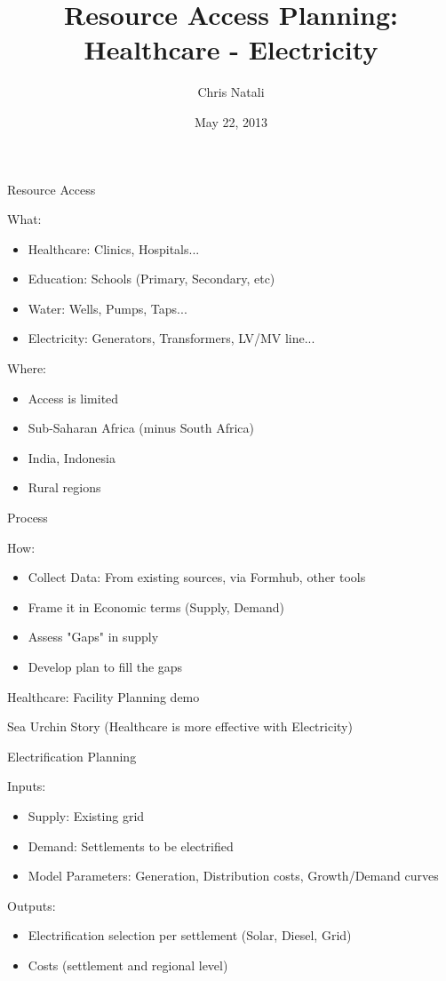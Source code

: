 \documentclass{beamer}
\title{Resource Access Planning:  Healthcare - Electricity}
\author{Chris Natali}
\institute{Modi Labs at Columbia University}
\date{May 22, 2013}
\begin{document}
\begin{frame}{Resource Access}

  What: 
  \begin{itemize}
  \item[] Healthcare:  Clinics, Hospitals...
  \item[] Education:  Schools (Primary, Secondary, etc)
  \item[] Water:  Wells, Pumps, Taps...
  \item[] Electricity:  Generators, Transformers, LV/MV line...
  \end{itemize}
 
  \bigskip 

  Where: 
  \begin{itemize}
  \item[] Access is limited
  \item[] Sub-Saharan Africa (minus South Africa)
  \item[] India, Indonesia
  \item[] Rural regions
  \end{itemize}


\end{frame}


\begin{frame}{Process}

  How: 
  \begin{itemize}
  \item[] Collect Data:  From existing sources, via Formhub, other tools
  \item[] Frame it in Economic terms (Supply, Demand)
  \item[] Assess "Gaps" in supply 
  \item[] Develop plan to fill the gaps
  \end{itemize}

  \bigskip 
  Healthcare:  Facility Planning demo

  \bigskip 
  Sea Urchin Story (Healthcare is more effective with Electricity)

\end{frame}

\begin{frame}{Electrification Planning}
  
  Inputs: 
  \begin{itemize}
  \item[] Supply:  Existing grid
  \item[] Demand:  Settlements to be electrified
  \item[] Model Parameters:  Generation, Distribution costs, Growth/Demand curves
  \end{itemize}

  \bigskip 

  Outputs: 
  \begin{itemize}
  \item[] Electrification selection per settlement (Solar, Diesel, Grid)
  \item[] Costs (settlement and regional level)
  \end{itemize}

\end{frame}
\end{document}
